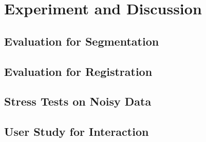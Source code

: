 \section{Experiment and Discussion}
\subsection{Evaluation for Segmentation}
\subsection{Evaluation for Registration}
\subsection{Stress Tests on Noisy Data}
\subsection{User Study for Interaction}
